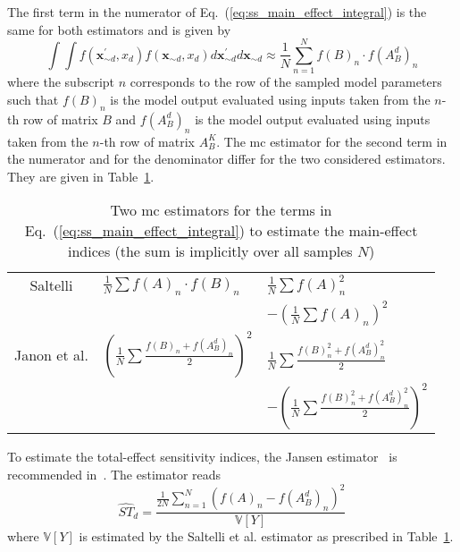 The first term in the numerator of Eq.~(\ref{eq:ss_main_effect_integral}) is the same for both estimators and is given by
\begin{equation}
  \int \int f(\mathbf{x}^{\prime}_{\sim d}, x_d) f(\mathbf{x}_{\sim d}, x_d) d\mathbf{x}^{\prime}_{\sim d} d\mathbf{x}_{\sim d} \approx \frac{1}{N}\sum_{n=1}^N f(B)_n \cdot f(A_B^d)_n
\label{eq:ss_first_term}
\end{equation}
where the subscript $n$ corresponds to the row of the sampled model parameters 
such that $f(B)_n$ is the model output evaluated using inputs taken from the $n$-th row of matrix $B$ 
and $f(A_B^d)_n$ is the model output evaluated using inputs taken from the $n$-th row of matrix $A_B^K$.
The \gls{mc} estimator for the second term in the numerator and for the denominator differ for the two considered estimators.
They are given in Table~\ref{tab:ss_main_effect_estimator}.

\begin{table}[h]
	\myfloatalign
	\caption[Monte Carlo estimators to estimate the main-effect indices]{Two \gls{mc} estimators for the terms in Eq.~(\ref{eq:ss_main_effect_integral}) to estimate the main-effect indices (the sum is implicitly over all samples $N$)}
	\label{tab:ss_main_effect_estimator}
	\begin{tabularx}{\textwidth}{cll} \toprule
		\tableheadline{Estimator}     & \tableheadline{$\mathbb{E}^2[Y] = \left( \int f d\mathbf{x}\right)^2$} & \tableheadline{$\mathbb{V}[Y] = \int f^2 d\mathbf{x} - \left( \int f d\mathbf{x}\right)^2$} \\ \midrule 
		Saltelli             & $\frac{1}{N} \sum f(A)_n \cdot f(B)_n$  & $\frac{1}{N}\sum f(A)_n^2$  \\
    \cite{Saltelli2002}  &                                         & $-\left(\frac{1}{N}\sum f(A)_n\right)^2$\\
		Janon et al.         & $\left(\frac{1}{N} \sum \frac{f(B)_n + f(A_B^d)_n}{2}\right)^2$  & $\frac{1}{N} \sum \frac{f(B)_n^2 + f(A_B^d)_n^2}{2}$ \\
    \cite{Janon2014}     &                                                                  & $-\left(\frac{1}{N} \sum \frac{f(B)_n^2 + f(A_B^d)_n^2}{2}\right)^2$ \\
		\bottomrule
	\end{tabularx}
\end{table}

To estimate the total-effect sensitivity indices, the Jansen estimator~\cite{Jansen1999} is recommended in~\cite{Saltelli2010a}.
The estimator reads
\begin{equation}
  \hat{ST}_d = \frac{\frac{1}{2N}\sum_{n=1}^{N}\left(f(A)_n - f(A_B^d)_n\right)^2}{\mathbb{V}[Y]}
\label{eq:ss_jansen_estimator}
\end{equation}
where $\mathbb{V}[Y]$ is estimated by the Saltelli et al. estimator as prescribed in Table~\ref{tab:ss_main_effect_estimator}.

